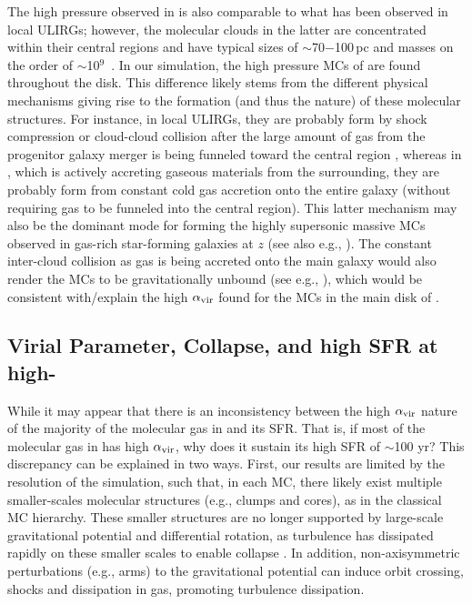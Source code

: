 \IfFileExists{emulateapjlegacy.cls}{\documentclass[iop]{emulateapjlegacy}}{\documentclass[iop]{emulateapj}}
\begin{document}
The high pressure observed in \flower is also comparable to what has been observed in local ULIRGs; however, the 
molecular clouds in the latter are concentrated within their central regions and have typical sizes of $\sim$70$-$100\,pc and masses on the order of $\sim$10$^9$\,\Msun
\citep{Downes98a, Sakamoto08a}. In our simulation, the high pressure MCs of \flower are 
found throughout the disk. This difference likely stems from the different physical mechanisms giving rise 
to the formation (and thus the nature) of these molecular structures. 
For instance, in local ULIRGs, they are probably form by shock compression or cloud-cloud 
collision after the large amount of gas from the progenitor galaxy merger 
is being funneled toward the central region \citep{Tan00a, Wu18a},  %
whereas in \flower, which is actively accreting gaseous materials 
from the surrounding, they are probably form from constant cold gas accretion onto the entire galaxy (without 
requiring gas to be funneled into the central region).
This latter mechanism may also be the dominant mode for forming the highly supersonic massive MCs observed 
in gas-rich star-forming galaxies at $z$ (see also e.g., \citealt{Swinbank11a}).
The constant inter-cloud collision as gas is being accreted onto the main galaxy would also render 
the MCs to be gravitationally unbound (see e.g., \citealt{Dobbs11a}), which would be consistent with/explain the 
high $\alpha_{\rm vir}$ found for the MCs in the main disk of \flower.


\subsection{Virial Parameter, Collapse, and high SFR at high-\z}

While it may appear that there is an inconsistency between the high $\alpha_{\rm vir}$
nature of the majority of the molecular gas in \flower and its SFR.
That is, if most of the molecular gas in \flower has high $\alpha_{\rm vir}$, why does it sustain its high SFR of $\sim$100\,\Msun\,yr\pmOne?
This discrepancy can be explained in two ways.
First, our results are limited by the resolution of the simulation, such that, in each MC, there
likely exist multiple smaller-scales molecular structures (e.g., clumps and cores),
as in the classical MC hierarchy. These smaller structures are 
no longer supported by large-scale gravitational potential and differential rotation,
as turbulence has dissipated rapidly on these smaller scales to enable collapse \citep{Clark04a}.
In addition, non-axisymmetric perturbations (e.g., arms) to the gravitational potential
can induce orbit crossing, shocks and dissipation in gas, promoting turbulence dissipation.
\end{document}
